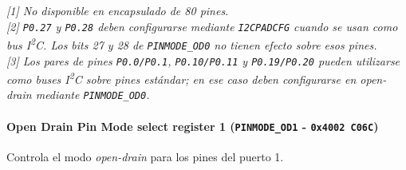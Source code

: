 \noindent\textit{[1] No disponible en encapsulado de 80 pines.}\\
\textit{[2] \texttt{P0.27} y \texttt{P0.28} deben configurarse mediante \texttt{I2CPADCFG} cuando se usan como bus I\textsuperscript{2}C. Los bits 27 y 28 de \texttt{PINMODE\_OD0} no tienen efecto sobre esos pines.}\\
\textit{[3] Los pares de pines \texttt{P0.0/P0.1}, \texttt{P0.10/P0.11} y \texttt{P0.19/P0.20} pueden utilizarse como buses I\textsuperscript{2}C sobre pines estándar; en ese caso deben configurarse en \textit{open-drain} mediante \texttt{PINMODE\_OD0}.}

\paragraph{Open Drain Pin Mode select register 1 (\texttt{PINMODE\_OD1} - \texttt{0x4002 C06C})}
Controla el modo \textit{open-drain} para los pines del puerto 1.

